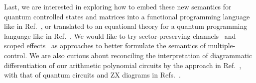 Last, we are interested in exploring how to embed these new semantics for quantum controlled states and matrices into a functional programming language like in Ref.~\cite{rennela2020clctrllinlogic}, or translated to an equational theory for a quantum programming language like in Ref.~\cite{staton2015algqpl}.
We would like to try sector-preserving channels~\cite{Vanrietvelde2021ctrlsector} and scoped effects~\cite{lindley2024scoped} as approaches to better formulate the semantics of multiple-control.
We are also curious about reconciling the interpretation of diagrammatic differentiation of our arithmetic polynomial circuits by the approach in Ref.~\cite{wilson2023diffpolycirc}, with that of quantum circuits and ZX diagrams in Refs.~\cite{toumi2021diagdiff, wang2022diffintzx, jeandel2024adddiffzx}.